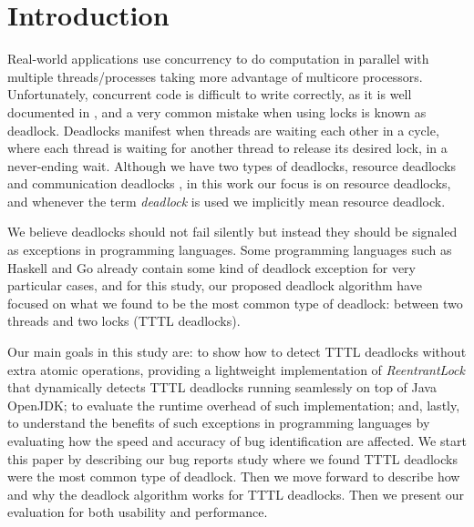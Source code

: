 \section{Introduction}

Real-world applications use concurrency to do computation in parallel with multiple threads/processes taking more advantage of multicore processors. Unfortunately, concurrent code is difficult to write correctly, as it is well documented in \cite{lu}, and a very common mistake when using locks is known as deadlock.
Deadlocks manifest when threads are waiting each other in a cycle, where each thread is waiting for another thread to release its desired lock, in a never-ending wait.
Although we have two types of deadlocks, resource deadlocks and communication deadlocks \cite{singhal} \cite{knapp}, in this work our focus is on resource deadlocks, and whenever the term \emph{deadlock} is used we implicitly mean resource deadlock.

We believe deadlocks should not fail silently but instead they should be signaled as exceptions in programming languages. Some programming languages such as Haskell and Go already contain some kind of deadlock exception for very particular cases, and for this study, our proposed deadlock algorithm have focused on what we found to be the most common type of deadlock: between two threads and two locks (TTTL deadlocks).

Our main goals in this study are: to show how to detect TTTL deadlocks without extra atomic operations, providing a lightweight implementation of \emph{ReentrantLock} that dynamically detects TTTL deadlocks running seamlessly on top of Java OpenJDK; to evaluate the runtime overhead of such implementation; and, lastly, to understand the benefits of such exceptions in programming languages by evaluating how the speed and accuracy of bug identification are affected. We start this paper by describing our bug reports study where we found TTTL deadlocks were the most common type of deadlock. Then we move forward to describe how and why the deadlock algorithm works for TTTL deadlocks. Then we present our evaluation for both usability and performance.





